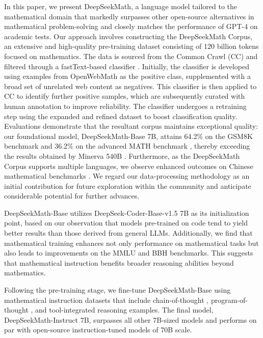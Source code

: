 In this paper, we present DeepSeekMath, a language model tailored to the mathematical domain that markedly surpasses other open-source alternatives in mathematical problem-solving and closely matches the performance of GPT-4 on academic tests. Our approach involves constructing the DeepSeekMath Corpus, an extensive and high-quality pre-training dataset consisting of 120 billion tokens focused on mathematics. The data is sourced from the Common Crawl (CC) and filtered through a fastText-based classifier \citep{joulin2016fasttext}. Initially, the classifier is developed using examples from OpenWebMath \citep{openwebmath} as the positive class, supplemented with a broad set of unrelated web content as negatives. This classifier is then applied to CC to identify further positive samples, which are subsequently curated with human annotation to improve reliability. The classifier undergoes a retraining step using the expanded and refined dataset to boost classification quality. Evaluations demonstrate that the resultant corpus maintains exceptional quality: our foundational model, DeepSeekMath-Base 7B, attains 64.2\% on the GSM8K benchmark \citep{gsm8k} and 36.2\% on the advanced MATH benchmark \citep{MATH}, thereby exceeding the results obtained by Minerva 540B \citep{minerva}. Furthermore, as the DeepSeekMath Corpus supports multiple languages, we observe enhanced outcomes on Chinese mathematical benchmarks \citep{wei2023cmath,agieval}. We regard our data-processing methodology as an initial contribution for future exploration within the community and anticipate considerable potential for further advances.

DeepSeekMath-Base utilizes DeepSeek-Coder-Base-v1.5 7B \citep{deepseek-coder} as its initialization point, based on our observation that models pre-trained on code tend to yield better results than those derived from general LLMs. Additionally, we find that mathematical training enhances not only performance on mathematical tasks but also leads to improvements on the MMLU \citep{mmlu} and BBH \citep{bbh} benchmarks. This suggests that mathematical instruction benefits broader reasoning abilities beyond mathematics.

Following the pre-training stage, we fine-tune DeepSeekMath-Base using mathematical instruction datasets that include chain-of-thought \citep{cot}, program-of-thought \citep{pot,pal}, and tool-integrated reasoning \citep{tora} examples. The final model, DeepSeekMath-Instruct 7B, surpasses all other 7B-sized models and performs on par with open-source instruction-tuned models of 70B scale.

